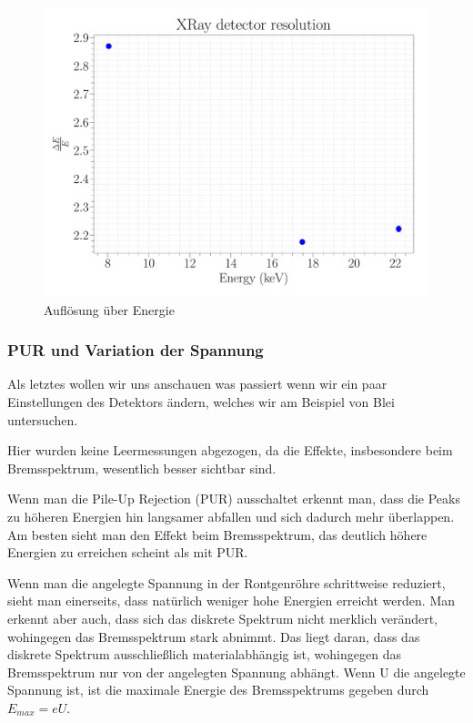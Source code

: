 \documentclass[a4paper,14pt]{article}
\begin{document}
\begin{figure}[H]
\centering
\includegraphics[width=\textwidth]{../Figures/xray_resolution.pdf}
\caption{Auflösung über Energie}
\label{XRay_resolution}
\end{figure}

\subsubsection{PUR und Variation der Spannung}
Als letztes wollen wir uns anschauen was passiert wenn wir ein paar Einstellungen des Detektors ändern, welches wir am Beispiel von Blei untersuchen.

Hier wurden keine Leermessungen abgezogen, da die Effekte, insbesondere beim Bremsspektrum, wesentlich besser sichtbar sind.

Wenn man die Pile-Up Rejection (PUR) ausschaltet erkennt man, dass die Peaks zu höheren Energien hin langsamer abfallen und sich dadurch mehr überlappen. Am besten sieht man den Effekt beim Bremsspektrum, das deutlich höhere Energien zu erreichen scheint als mit PUR.

Wenn man die angelegte Spannung in der Rontgenröhre schrittweise reduziert, sieht man einerseits, dass natürlich weniger hohe Energien erreicht werden. Man erkennt aber auch, dass sich das diskrete Spektrum nicht merklich verändert, wohingegen das Bremsspektrum stark abnimmt. Das liegt daran, dass das diskrete Spektrum ausschließlich materialabhängig ist, wohingegen das Bremsspektrum nur von der angelegten Spannung abhängt. Wenn U die angelegte Spannung ist, ist die maximale Energie des Bremsspektrums gegeben durch $E_{max} = eU$.
\end{document}
